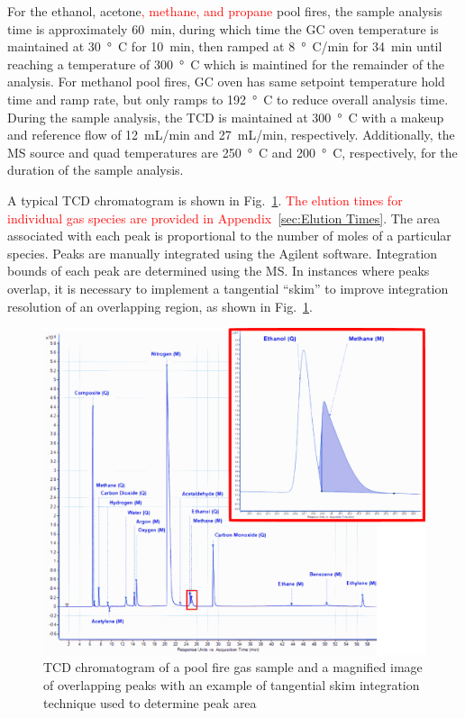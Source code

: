\documentclass[12pt]{article}
\begin{document}
For the ethanol, acetone\textcolor{red}{, methane, and propane} pool fires, the sample analysis time is approximately \SI{60}{min}, during which time the GC oven temperature is maintained at \SI{30}{\degree C} for \SI{10}{min}, then ramped at \SI{8}{\degree C/min} for \SI{34}{min} until reaching a temperature of \SI{300}{\degree C} which is maintined for the remainder of the analysis. For methanol pool fires, GC oven has same setpoint temperature hold time and ramp rate, but only ramps to \SI{192}{\degree C} to reduce overall analysis time. During the sample analysis, the TCD is maintained at \SI{300}{\degree C} with a makeup and reference flow of 12~mL/min and 27~mL/min, respectively. Additionally, the MS source and quad temperatures are \SI{250}{\degree C} and \SI{200}{\degree C}, respectively, for the duration of the sample analysis.

A typical TCD chromatogram is shown in Fig.~\ref{fig:Chromatogram}. \textcolor{red}{The elution times for individual gas species are provided in Appendix~\ref{sec:Elution Times}}. The area associated with each peak is proportional to the number of moles of a particular species. Peaks are manually integrated using the Agilent software. Integration bounds of each peak are determined using the MS. In instances where peaks overlap, it is necessary to implement a tangential ``skim'' to improve integration resolution of an overlapping region, as shown in Fig.~\ref{fig:Chromatogram}.

\begin{figure}[h!]
	\centering
\includegraphics[width=\textwidth,keepaspectratio]{Chromatogram.png}
	\caption[Chromatogram of a pool fire gas sample]{TCD chromatogram of a pool fire gas sample and a magnified image of overlapping peaks with an example of tangential skim integration technique used to determine peak area}
	\label{fig:Chromatogram}
\end{figure}
\end{document}
